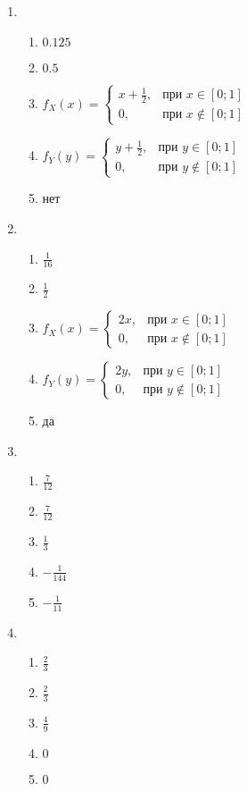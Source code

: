 \begin{multicols}{2}
\begin{enumerate}
\item
\begin{enumerate}
\item $0.125$
\item $0.5$
\item $f_{X}(x) = \begin{cases} x+\frac{1}{2}, & \text{при } x \in [0;1] \\ 0 , & \text{при } x \not\in [0;1] \end{cases}$
\item $f_{Y}(y) = \begin{cases} y+\frac{1}{2}, & \text{при } y \in [0;1] \\ 0 , & \text{при } y \not\in [0;1] \end{cases}$
\item нет
\end{enumerate}

\item
\begin{enumerate}
\item $\frac{1}{16}$
\item $\frac{1}{2}$
\item $f_{X}(x) =
\begin{cases} 2x, & \text{при } x \in [0;1] \\
0 , & \text{при } x \not\in [0;1]
\end{cases}$
\item $f_{Y}(y) =
\begin{cases} 2y, & \text{при } y \in [0;1] \\
0 , & \text{при } y \not\in [0;1]
\end{cases}$
\item да
\end{enumerate}
\item
\begin{enumerate}
\item $\frac{7}{12}$
\item $\frac{7}{12}$
\item $\frac{1}{3}$
\item $-\frac{1}{144}$
\item $-\frac{1}{11}$
\end{enumerate}

\item
\begin{enumerate}
\item $\frac{2}{3}$
\item $\frac{2}{3}$
\item $\frac{4}{9}$
\item $0$
\item $0$
\end{enumerate}


\end{enumerate}
\end{multicols}
